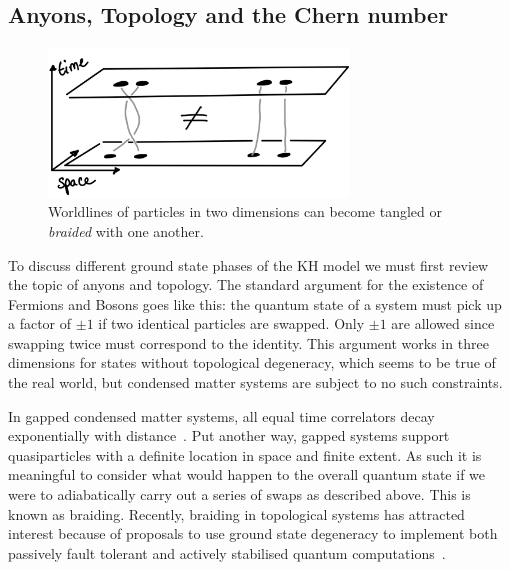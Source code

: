 \hypertarget{sec:anyons}{%
\subsection{Anyons, Topology and the Chern number}\label{sec:anyons}}

\hypertarget{fig:braiding}{%
\begin{figure}
\centering
\includegraphics[width=0.71\textwidth,height=\textheight]{figure_code/amk_chapter/braiding.png}
\caption[{Braiding in Two Dimensions}]{Worldlines of particles in two dimensions can become tangled or \emph{braided} with one another.}
\label{fig:braiding}
\end{figure}
}

To discuss different ground state phases of the KH model we must first review the topic of anyons and topology. The standard argument for the existence of Fermions and Bosons goes like this: the quantum state of a system must pick up a factor of \(\pm1\) if two identical particles are swapped. Only \(\pm1\) are allowed since swapping twice must correspond to the identity. This argument works in three dimensions for states without topological degeneracy, which seems to be true of the real world, but condensed matter systems are subject to no such constraints.

In gapped condensed matter systems, all equal time correlators decay exponentially with distance~\autocite{hastingsLiebSchultzMattisHigherDimensions2004}. Put another way, gapped systems support quasiparticles with a definite location in space and finite extent. As such it is meaningful to consider what would happen to the overall quantum state if we were to adiabatically carry out a series of swaps as described above. This is known as braiding. Recently, braiding in topological systems has attracted interest because of proposals to use ground state degeneracy to implement both passively fault tolerant and actively stabilised quantum computations~\autocite{kitaev_fault-tolerant_2003,poulinStabilizerFormalismOperator2005,hastingsDynamicallyGeneratedLogical2021}.


